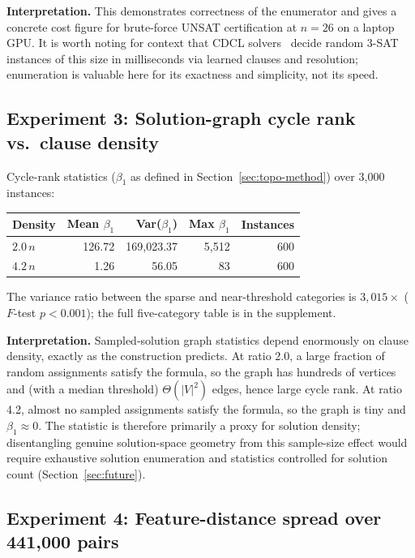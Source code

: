 \documentclass[11pt]{article}
\newcommand{\SAT}{\textsf{SAT}}
\begin{document}
\textbf{Interpretation.} This demonstrates correctness of the enumerator and gives a concrete cost figure for brute-force UNSAT certification at $n=26$ on a laptop GPU. It is worth noting for context that CDCL solvers~\cite{MiniSat} decide random 3-\SAT{} instances of this size in milliseconds via learned clauses and resolution; enumeration is valuable here for its exactness and simplicity, not its speed.

\subsection{Experiment 3: Solution-graph cycle rank vs.\ clause density}
\label{sec:exp3}

Cycle-rank statistics ($\beta_1$ as defined in Section~\ref{sec:topo-method}) over 3{,}000 instances:

\begin{center}
\begin{tabular}{lrrrr}
\toprule
Density & Mean $\beta_1$ & Var($\beta_1$) & Max $\beta_1$ & Instances \\
\midrule
$2.0\,n$ & 126.72 & 169{,}023.37 & 5{,}512 & 600 \\
$4.2\,n$ & 1.26 & 56.05 & 83 & 600 \\
\bottomrule
\end{tabular}
\end{center}

The variance ratio between the sparse and near-threshold categories is $3{,}015\times$ ($F$-test $p < 0.001$); the full five-category table is in the supplement.

\textbf{Interpretation.} Sampled-solution graph statistics depend enormously on clause density, exactly as the construction predicts. At ratio 2.0, a large fraction of random assignments satisfy the formula, so the graph has hundreds of vertices and (with a median threshold) $\Theta(|V|^2)$ edges, hence large cycle rank. At ratio 4.2, almost no sampled assignments satisfy the formula, so the graph is tiny and $\beta_1 \approx 0$. The statistic is therefore primarily a proxy for solution density; disentangling genuine solution-space geometry from this sample-size effect would require exhaustive solution enumeration and statistics controlled for solution count (Section~\ref{sec:future}).

\subsection{Experiment 4: Feature-distance spread over 441{,}000 pairs}
\label{sec:exp4}
\end{document}
